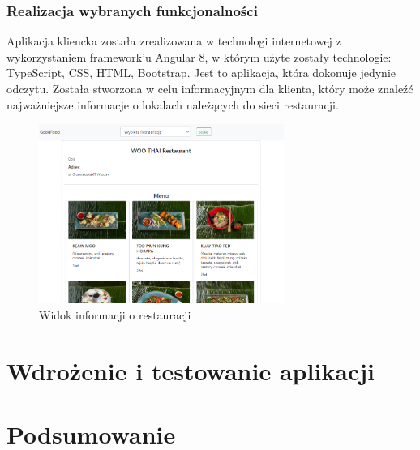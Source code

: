 \documentclass{article}
\begin{document}
		\subsubsection{Realizacja wybranych funkcjonalności}	
		Aplikacja kliencka została zrealizowana w technologi internetowej z wykorzystaniem framework'u Angular 8, w którym użyte zostały technologie:  TypeScript, CSS, HTML, Bootstrap.
		Jest to aplikacja, która dokonuje jedynie odczytu. Została stworzona w celu informacyjnym dla klienta, który może znaleźć najważniejsze informacje o lokalach należących do sieci restauracji.
			\begin{figure}[hbt!]
				\includegraphics[width=8cm]{Files/Pictures/Info_C}
				\centering
				\caption{Widok informacji o restauracji}
			\end{figure}
\newpage
\section{Wdrożenie i testowanie aplikacji}

\section{Podsumowanie}
 
\end{document}
